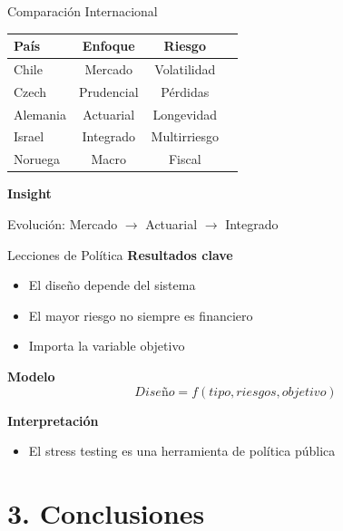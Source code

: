 \documentclass{beamer}
\begin{document}
\begin{frame}{Comparación Internacional}
\begin{tabular}{lccc}
País & Enfoque & Riesgo \\
\hline
Chile & Mercado & Volatilidad \\
Czech & Prudencial & Pérdidas \\
Alemania & Actuarial & Longevidad \\
Israel & Integrado & Multirriesgo \\
Noruega & Macro & Fiscal \\
\end{tabular}

\vspace{0.5cm}

\textbf{Insight}
\begin{block}{}
Evolución: Mercado $\rightarrow$ Actuarial $\rightarrow$ Integrado
\end{block}
\end{frame}

\begin{frame}{Lecciones de Política}
\textbf{Resultados clave}
\begin{itemize}
\item El diseño depende del sistema
\item El mayor riesgo no siempre es financiero
\item Importa la variable objetivo
\end{itemize}

\textbf{Modelo}
\[
Diseño = f(tipo, riesgos, objetivo)
\]

\textbf{Interpretación}
\begin{itemize}
\item El stress testing es una herramienta de política pública
\end{itemize}
\end{frame}


\section{3. Conclusiones}
\end{document}
